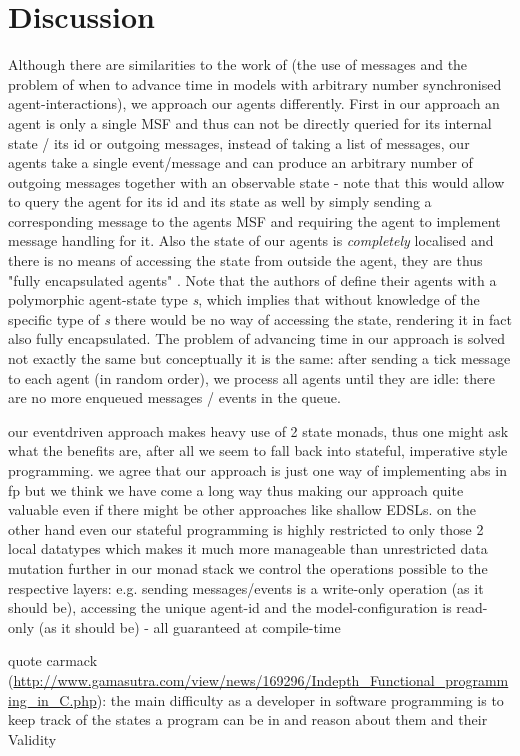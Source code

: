 \section{Discussion}
Although there are similarities to the work of \cite{botta_time_2010} (the use of messages and the problem of when to advance time in models with arbitrary number synchronised agent-interactions), we approach our agents differently. First in our approach an agent is only a single MSF and thus can not be directly queried for its internal state / its id or outgoing messages, instead of taking a list of messages, our agents take a single event/message and can produce an arbitrary number of outgoing messages together with an observable state - note that this would allow to query the agent for its id and its state as well by simply sending a corresponding message to the agents MSF and requiring the agent to implement message handling for it. Also the state of our agents is \textit{completely} localised and there is no means of accessing the state from outside the agent, they are thus "fully encapsulated agents" \cite{botta_time_2010}. Note that the authors of \cite{botta_time_2010} define their agents with a polymorphic agent-state type \textit{s}, which implies that without knowledge of the specific type of \textit{s} there would be no way of accessing the state, rendering it in fact also fully encapsulated. The problem of advancing time in our approach is solved not exactly the same but conceptually it is the same: after sending a tick message to each agent (in random order), we process all agents until they are idle: there are no more enqueued messages / events in the queue.

our eventdriven approach makes heavy use of 2 state monads, thus one might ask what the benefits are, after all we seem to fall back into stateful, imperative style programming. we agree that our approach is just one way of implementing abs in fp but we think we have come a long way thus making our approach quite valuable even if there might be other approaches like shallow EDSLs. on the other hand even our stateful programming is highly restricted to only those 2 local datatypes which makes it much more manageable than unrestricted data mutation
further in our monad stack we control the operations possible to the respective layers: e.g. sending messages/events is a write-only operation (as it should be), accessing the unique agent-id and the model-configuration is read-only (as it should be) - all guaranteed at compile-time

quote carmack (\url{http://www.gamasutra.com/view/news/169296/Indepth_Functional_programming_in_C.php}): the main difficulty as a developer in software programming is to keep track of the states a program can be in and reason about them and their Validity

